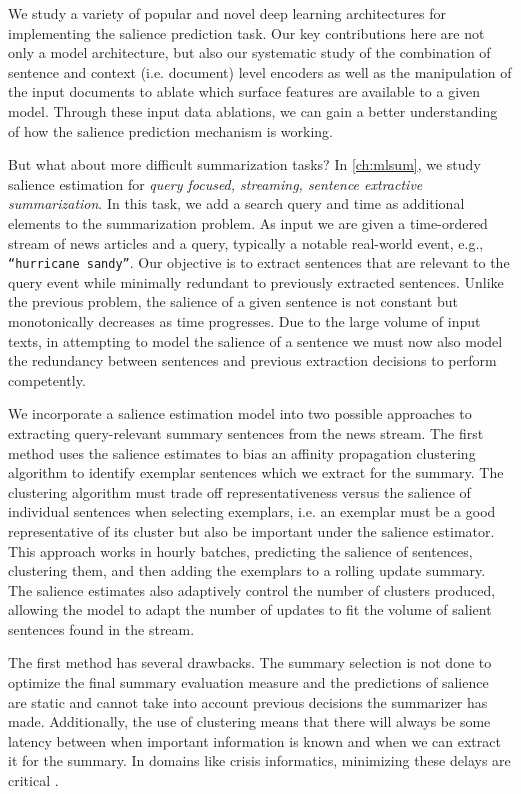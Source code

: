 We study a variety of popular and novel deep learning architectures for
implementing the salience prediction task. Our key contributions here are not
only a model architecture, but also our systematic study of the combination of
sentence and context (i.e. document) level encoders as well as the
manipulation of the input documents to ablate which surface features are
available to a given model. Through these input data ablations, we can gain a
better understanding of how the salience prediction mechanism is working.
 
But what about more difficult summarization tasks? In \autoref{ch:mlsum}, we
study salience estimation for \emph{query focused, streaming, sentence
extractive summarization}. In this task, we add a search query and time as
additional elements to the summarization problem. As input we are given a
time-ordered stream of news articles and a query, typically a notable
real-world event, e.g., \texttt{``hurricane sandy''}. Our objective is to
extract sentences that are relevant to the query event while minimally
redundant to previously extracted sentences. Unlike the previous problem, the
salience of a given sentence is not constant but monotonically decreases as
time progresses. Due to the large volume of input texts, in attempting to
model the salience of a sentence we must now also model the redundancy between
sentences and previous extraction decisions to perform competently.
      
We incorporate a salience estimation model into two possible approaches to
extracting query-relevant summary sentences from the news stream.  The first
method uses the salience estimates to bias an affinity propagation clustering
algorithm \citep{dueck2009} to identify exemplar sentences which we extract
for the summary.  The clustering algorithm must trade off representativeness
versus the salience of individual sentences when selecting exemplars, i.e. an
exemplar must be a good representative of its cluster but also be important
under the salience estimator.  This approach works in hourly batches,
predicting the salience of sentences, clustering them, and then adding the
exemplars to a rolling update summary. The salience estimates also adaptively
control the number of clusters produced, allowing the model to adapt the
number of updates to fit the volume of salient sentences found in the stream. 

The first method has several drawbacks. The summary selection is not done to
optimize the final summary evaluation measure and the predictions of salience
are static and cannot take into account previous decisions the summarizer has
made. Additionally, the use of clustering means that there will always be some
latency between when important information is known and when we can extract it
for the summary. In domains like crisis informatics, minimizing these delays
are critical \citep{starbird2013}.

